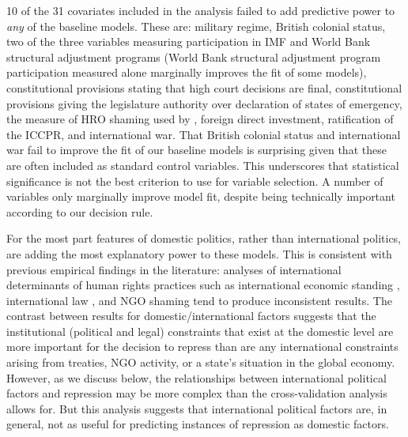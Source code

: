 \documentclass[11pt]{article}
\begin{document}
10 of the 31 covariates included in the analysis failed to add predictive power to {\it any} of the baseline models. These are: military regime, British colonial status, two of the three variables measuring participation in IMF and World Bank structural adjustment programs (World Bank structural adjustment program participation measured alone marginally improves the fit of some models), constitutional provisions stating that high court decisions are final, constitutional provisions giving the legislature authority over declaration of states of emergency, the measure of HRO shaming used by \citet{MurdieDavis2012}, foreign direct investment, ratification of the ICCPR, and international war. That British colonial status and international war fail to improve the fit of our baseline models is surprising given that these are often included as standard control variables. This underscores that statistical significance is not the best criterion to use for variable selection. A number of variables only marginally improve model fit, despite being technically important according to our decision rule.

For the most part features of domestic politics, rather than international politics, are adding the most explanatory power to these models. This is consistent with previous empirical findings in the literature: analyses of international determinants of human rights practices such as international economic standing \citep{HafnerBurton2005jpr}, international law \citep{Keith1999,Hathaway2002,Neumayer2005,Simmons2009,PowellStaton2009,Hill2010,ConradRitter2013,Lupu2013}, and NGO shaming \citep{HafnerBurton2008,Franklin2008,MurdieDavis2012} tend to produce inconsistent results. The contrast between results for domestic/international factors suggests that the institutional (political and legal) constraints that exist at the domestic level are more important for the decision to repress than are any international constraints arising from treaties, NGO activity, or a state's situation in the global economy. However, as we discuss below, the relationships between international political factors and repression may be more complex than the cross-validation analysis allows for. But this analysis suggests that international political factors are, in general, not as useful for predicting instances of repression as domestic factors. 
\end{document}
